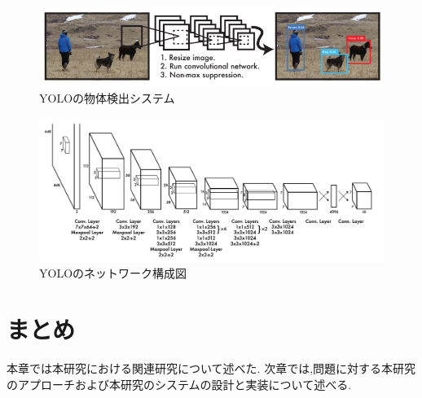\begin{figure}[htbp]
  \begin{center}
    \includegraphics[width=\textwidth]{figs/Yolo_Detection_system.png}
    \caption{YOLOの物体検出システム\cite{yolov3}}
    \label{fig:yolo_system}
  \end{center}
\end{figure}

\begin{figure}[htbp]
  \begin{center}
    \includegraphics[width=\textwidth]{figs/yolo_architecture.png}
    \caption{YOLOのネットワーク構成図\cite{yolov3}}
    \label{fig:yolo_network}
  \end{center}
 \end{figure}

 \section{まとめ}
 本章では本研究における関連研究について述べた.
 次章では,問題に対する本研究のアプローチおよび本研究のシステムの設計と実装について述べる.